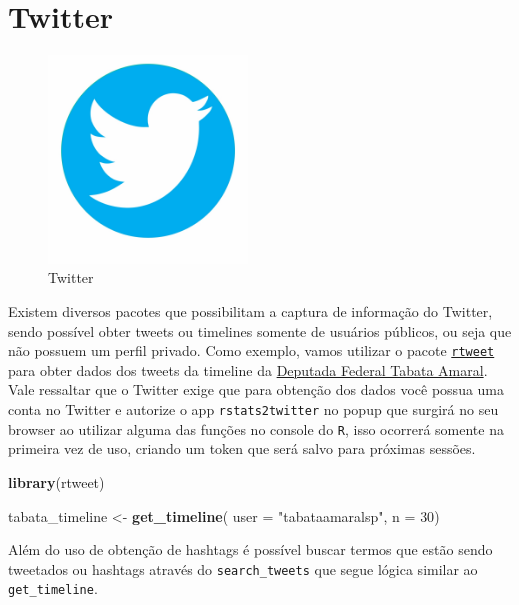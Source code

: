 \documentclass[]{book}
\newenvironment{Shaded}{\begin{snugshade}}{\end{snugshade}}
\newcommand{\DataTypeTok}[1]{\textcolor[rgb]{0.13,0.29,0.53}{#1}}
\newcommand{\DecValTok}[1]{\textcolor[rgb]{0.00,0.00,0.81}{#1}}
\newcommand{\KeywordTok}[1]{\textcolor[rgb]{0.13,0.29,0.53}{\textbf{#1}}}
\newcommand{\NormalTok}[1]{#1}
\newcommand{\StringTok}[1]{\textcolor[rgb]{0.31,0.60,0.02}{#1}}
\begin{document}
\hypertarget{twitter}{%
\section{Twitter}\label{twitter}}

\begin{figure}
\centering
\includegraphics[width=2.08333in,height=\textheight]{images/twiteer.png}
\caption{Twitter}
\end{figure}

Existem diversos pacotes que possibilitam a captura de informação do Twitter, sendo
possível obter tweets ou timelines somente de usuários públicos, ou seja que não possuem
um perfil privado. Como exemplo, vamos utilizar o pacote \href{https://github.com/ropensci/rtweet}{\texttt{rtweet}}
para obter dados dos tweets da timeline da \href{https://www.camara.leg.br/deputados/204534}{Deputada Federal Tabata Amaral}.
Vale ressaltar que o Twitter exige que para obtenção dos dados você possua uma conta
no Twitter e autorize o app \texttt{rstats2twitter} no popup que surgirá no seu browser
ao utilizar alguma das funções no console do \texttt{R}, isso ocorrerá somente na primeira
vez de uso, criando um token que será salvo para próximas sessões.

\begin{Shaded}
\begin{Highlighting}[]
\KeywordTok{library}\NormalTok{(rtweet)}

\NormalTok{tabata_timeline <-}\StringTok{ }\KeywordTok{get_timeline}\NormalTok{( }\DataTypeTok{user =} \StringTok{"tabataamaralsp"}\NormalTok{, }\DataTypeTok{n =} \DecValTok{30}\NormalTok{)}
\end{Highlighting}
\end{Shaded}

Além do uso de obtenção de hashtags é possível buscar termos que estão sendo tweetados
ou hashtags através do \texttt{search\_tweets} que segue lógica similar ao \texttt{get\_timeline}.
\end{document}
